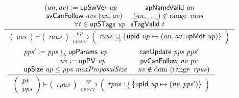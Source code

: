 \begin{figure}[htb]
  \begin{equation}
    \label{eq:rule:up-av-validity}
    \inference
    {
      (\var{an}, \var{av}) \leteq \upSwVer{up}
      & \fun{apNameValid}~\var{an}\\
      & \fun{svCanFollow}~\var{avs}~(\var{an}, \var{av})
      & (\var{an}, \wcard, \wcard) \notin \range~\var{raus}\\
      \forall \var{t} \in \fun{upSTags}~\var{up} \cdot \fun{sTagValid}~t
    }
    {
      {\left(
        \begin{array}{l}
          \var{avs}
        \end{array}
      \right)}
      \vdash
      {
        \left(
          \begin{array}{l}
            \var{raus}
          \end{array}
        \right)
      }
      \trans{upsvv}{up}
      {
        \left(
          \begin{array}{l}
            \var{raus} \unionoverrideRight \{ \upId{up} \mapsto (\var{an}, \var{av}, \upMetadata{up})\}
          \end{array}
        \right)
      }
    }
  \end{equation}
  \nextdef
    \begin{equation}
    \label{eq:rule:up-pv-validity}
    \inference
    {
      \var{pps'} \leteq \var{pps} \unionoverrideRight \upParams{up}
      & \fun{canUpdate}~\var{pps}~\var{pps'}\\
      & \var{nv} \leteq \upPV{up}
      & \fun{pvCanFollow}~\var{nv}~\var{pv}\\
      & \upSize{up} \leq \var{pps}~\var{maxProposalSize}
      & \var{nv} \notin \dom~(\range~\var{rpus})
    }
    {
      {\left(
        \begin{array}{l}
          \var{pv}\\
          \var{pps}
        \end{array}
      \right)}
      \vdash
      {
        \left(
          \begin{array}{l}
            \var{rpus}
          \end{array}
        \right)
      }
      \trans{uppvv}{\var{up}}
      {
        \left(
          \begin{array}{l}
            \var{rpus} \unionoverrideRight
            \{ \upId{up} \mapsto (\var{nv}, \var{pps'}) \}
          \end{array}
        \right)
      }
    }
  \end{equation}

\end{figure}
